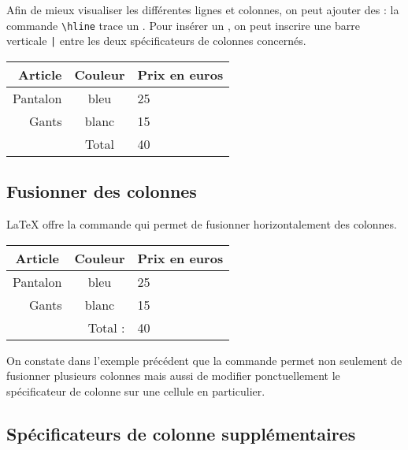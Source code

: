 \documentclass[10pt,french,openright,twoside]{book}
\begin{document}
Afin de mieux visualiser les différentes lignes et colonnes, on peut ajouter des  : la commande \verb!\hline! trace un .
Pour insérer un , on peut inscrire une barre verticale \verb!|! entre les deux spécificateurs de colonnes concernés.\bigskip

{\NewFont
\begin{SideBySideExample}
    \begin{tabular}{r||c|l}
        Article & Couleur & Prix en euros \\ \hline\hline
        Pantalon & bleu & 25 \\
        Gants & blanc & 15 \\ \hline
          & Total & 40
    \end{tabular}
\end{SideBySideExample}
}

\subsection{Fusionner des colonnes}

\LaTeX{} offre la commande  qui permet de fusionner horizontalement des colonnes.\bigskip

{\NewFont
\begin{SideBySideExample}
    \begin{tabular}{r|c|l}
        \multicolumn{1}{c|}{Article} &
        Couleur & Prix en euros \\ \hline
        Pantalon & bleu & 25 \\
        Gants & blanc & 15 \\ \hline
        \multicolumn{2}{r}{Total :} & 40
    \end{tabular}
\end{SideBySideExample}
}\bigskip

\begin{info}
    On constate dans l'exemple précédent que la commande  permet non seulement de fusionner plusieurs colonnes mais aussi de modifier ponctuellement le spécificateur de colonne sur une cellule en particulier.
\end{info}

\subsection{Spécificateurs de colonne supplémentaires}
\end{document}
